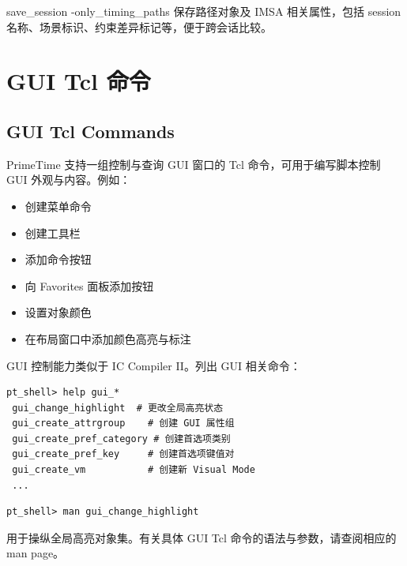 save_session -only_timing_paths 保存路径对象及 IMSA 相关属性，包括 session 名称、场景标识、约束差异标记等，便于跨会话比较。

\section{GUI Tcl 命令}
\subsection*{GUI Tcl Commands}

PrimeTime 支持一组控制与查询 GUI 窗口的 Tcl 命令，可用于编写脚本控制 GUI 外观与内容。例如：
\begin{itemize}
  \item 创建菜单命令
  \item 创建工具栏
  \item 添加命令按钮
  \item 向 Favorites 面板添加按钮
  \item 设置对象颜色
  \item 在布局窗口中添加颜色高亮与标注
\end{itemize}

GUI 控制能力类似于 IC Compiler II。列出 GUI 相关命令：
\begin{lstlisting}
pt_shell> help gui_*
 gui_change_highlight  # 更改全局高亮状态
 gui_create_attrgroup    # 创建 GUI 属性组
 gui_create_pref_category # 创建首选项类别
 gui_create_pref_key     # 创建首选项键值对
 gui_create_vm           # 创建新 Visual Mode
 ...
\end{lstlisting}

\begin{lstlisting}
pt_shell> man gui_change_highlight
\end{lstlisting}

 用于操纵全局高亮对象集。有关具体 GUI Tcl 命令的语法与参数，请查阅相应的 man page。

